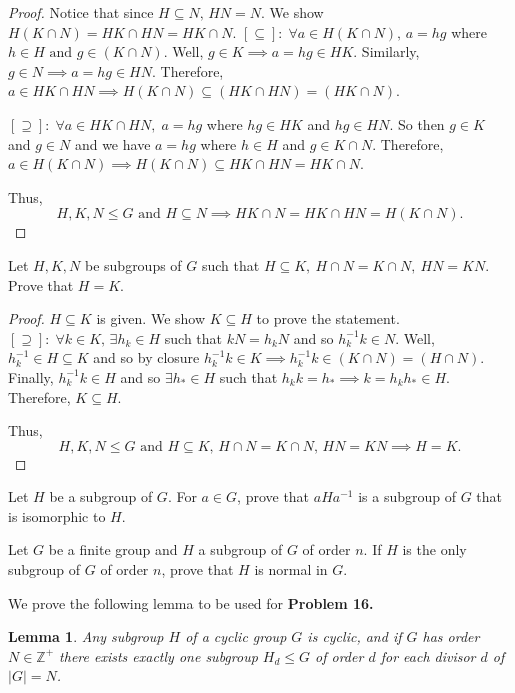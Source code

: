 \documentclass[addpoints,10pt]{exam}
\theoremstyle{plain}
\theoremstyle{definition}
\newtheorem{prob}[thm]{Problem}
\theoremstyle{plain}
\theoremstyle{plain}
\newtheorem*{lem*}{Lemma}
\theoremstyle{definition}
\let\oldprob\prob
\let\endoldprob\endprob
\renewenvironment{prob}
  {\begin{singlespace}\oldprob}
  {\endoldprob\end{singlespace}}
\newcommand{\belowtitle}{\leavevmode\newline}
\newcommand{\ZZ}{\ensuremath{\mathbb{Z}}}
\begin{document}
\begin{proof}
  Notice that since $H\subseteq N,\, HN=N$. We show $H(K\cap N)=HK\cap HN=HK\cap N.$\belowtitle
  $\mathbf{[\subseteq]:\;} \forall a\in H(K\cap N),\,a=hg$ where $h\in H\text{ and }g\in (K\cap N).$ Well, $g\in K\implies a=hg\in HK.$ Similarly, $g\in N \implies a=hg\in HN.$ Therefore, $a\in HK\cap HN\implies H(K\cap N)\subseteq (HK\cap HN)=(HK\cap N)$.

  $\mathbf{[\supseteq]:\;} \forall a\in HK\cap HN,\;a=hg$ where $hg\in HK$ and $hg\in HN.$ So then $g\in K$ and $g\in N$ and we have $a=hg$ where $h\in H$ and $g\in K\cap N$. Therefore, $a\in H(K\cap N)\implies H(K\cap N)\subseteq HK\cap HN=HK\cap N$.

  Thus,
  $$H,K,N\leq G\text{ and }H\subseteq N\implies HK\cap N=HK\cap HN=H(K\cap N).$$

\end{proof}
\newpage
\begin{prob}
  Let $H,K,N$ be subgroups of $G$ such that $H\subseteq K,\ H\cap N=K\cap N,\ HN=KN$. Prove that $H=K$.
\end{prob}

\begin{proof}
  $H\subseteq K$ is given. We show $K\subseteq H$ to prove the statement.\belowtitle
  $\mathbf{[\supseteq]:\;} \forall k\in K,\,\exists h_{k}\in H$ such that $kN=h_{k}N$ and so $h_{k}^{-1}k\in N.$ Well, $h_{k}^{-1}\in H\subseteq K$ and so by closure $h_{k}^{-1}k\in K\implies h_{k}^{-1}k\in (K\cap N)=(H\cap N).$ Finally, $h_{k}^{-1}k\in H$ and so $\exists h_{*}\in H$ such that $h_{k}k=h_{*}\implies k=h_{k}h_{*}\in H.$ Therefore, $K\subseteq H.$

  Thus,
  $$H,K,N\leq G\text{ and }H\subseteq K,\,H\cap N=K\cap N,\, HN=KN\implies H=K.$$
\end{proof}
\newpage

\begin{prob}
  Let $H$ be a subgroup of $G$. For $a\in G$, prove that $aHa^{-1}$ is a subgroup of $G$ that is isomorphic to $H$.
\end{prob}

\begin{prob}
  Let $G$ be a finite group and $H$ a subgroup of $G$ of order $n$. If $H$ is the only subgroup of $G$ of order $n$, prove that $H$ is normal in $G$.
\end{prob}
\newpage
We prove the following lemma to be used for \textbf{Problem 16.}
\begin{lem*}
  Any subgroup $H$ of a cyclic group $G$ is cyclic, and if $G$ has order $N\in \ZZ^{+}$ there exists exactly one subgroup $H_{d}\leq G$ of order $d$ for each divisor $d$ of $|G|=N$.
\end{lem*}
\end{document}
